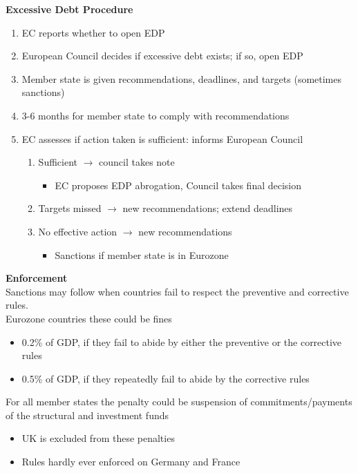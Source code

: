 \documentclass{beamer}
\begin{document}
\begin{frame}
  \textbf{Excessive Debt Procedure}
  \begin{enumerate}
    \item EC reports whether to open EDP
    \item European Council decides if excessive debt exists; if so, open EDP
    \item Member state is given recommendations, deadlines, and targets (sometimes sanctions)
    \item 3-6 months for member state to comply with recommendations
    \item EC assesses if action taken is sufficient: informs European Council
    \begin{enumerate}[i]
      \item Sufficient $\rightarrow$ council takes note
      \begin{itemize}
        \item EC proposes EDP abrogation, Council takes final decision
      \end{itemize}
      \item Targets missed $\rightarrow$ new recommendations; extend deadlines
      \item No effective action $\rightarrow$ new recommendations
      \begin{itemize}
        \item Sanctions if member state is in Eurozone
      \end{itemize}
    \end{enumerate}
  \end{enumerate}
\end{frame}


\begin{frame}
  \textbf{Enforcement}\\
   Sanctions may follow when countries fail to respect the preventive and corrective rules.\\
   Eurozone countries these could be fines
    \begin{itemize}
      \item 0.2\% of GDP, if they fail to abide by either the preventive or the corrective rules
      \item 0.5\% of GDP, if they repeatedly fail to abide by the corrective rules
    \end{itemize}
    \medskip
    For all member states the penalty could be suspension of commitments/payments of the structural and investment funds
    \begin{itemize}
      \item UK is excluded from these penalties
      \item Rules hardly ever enforced on Germany and France
    \end{itemize}    
\end{frame}
\end{document}
